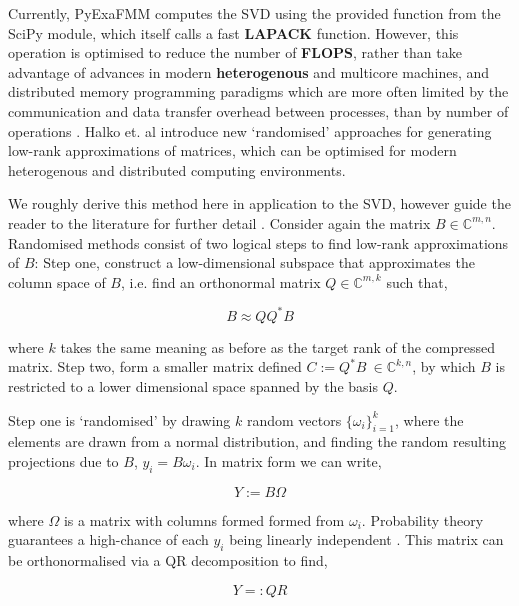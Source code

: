 Currently, \gls{PyExaFMM} computes the \gls{SVD} using the provided function
from the SciPy module, which itself calls a fast \textbf{\gls{LAPACK}}
function. However, this operation is optimised to reduce the number
of \textbf{\gls{FLOPS}}, rather than take advantage of advances in modern
\textbf{\gls{heterogenous}} and multicore machines, and
distributed memory programming paradigms which are more often limited by the
communication and data transfer overhead between processes, than by number of
operations \cite{Halko:2011:SIAM}. Halko et. al introduce new `randomised'
approaches for generating low-rank approximations of matrices, which can be
optimised for modern heterogenous and distributed computing environments.

We roughly derive this method here in application to the \gls{SVD}, however guide
the reader to the literature for further detail \cite{Erichson:2019:JOSS,Halko:2011:SIAM}.
Consider again the matrix $B \in \mathbb{C}^{m, n}$. Randomised methods consist
of two logical steps to find low-rank approximations of $B$: Step one, construct
a low-dimensional subspace that approximates the column space of $B$, i.e.
find an orthonormal matrix $Q \in \mathbb{C}^{m, k}$ such that,

\begin{equation}
    B \approx QQ^*B
    \label{eq:2_4_step_1_randomised}
\end{equation}

where $k$ takes the same meaning as before as the target rank of the compressed
matrix. Step two, form a smaller matrix defined $C := Q^*B \> \in \mathbb{C}^{k, n}$,
by which $B$ is restricted to a lower dimensional space spanned by the basis
$Q$.

Step one is `randomised' by drawing $k$ random vectors $\{ \omega_i \}_{i=1}^k$,
where the elements are drawn from a normal distribution, and finding the random
resulting projections due to $B$, $y_i = B \omega_i$. In matrix form we can write,

\begin{equation}
    Y := B \Omega
\end{equation}

where $\Omega$ is a matrix with columns formed formed from $\omega_i$.
Probability theory guarantees a high-chance of each $y_i$ being linearly independent
\cite{Erichson:2019:JOSS}. This matrix can be orthonormalised via a QR decomposition
to find,

\begin{equation}
    Y =: QR
\end{equation}

